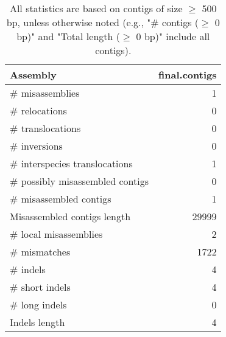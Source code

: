 \documentclass[12pt,a4paper]{article}
\begin{document}
\begin{table}[ht]
\begin{center}
\caption{All statistics are based on contigs of size $\geq$ 500 bp, unless otherwise noted (e.g., "\# contigs ($\geq$ 0 bp)" and "Total length ($\geq$ 0 bp)" include all contigs).}
\begin{tabular}{|l*{1}{|r}|}
\hline
Assembly & final.contigs \\ \hline
\# misassemblies & 1 \\ \hline
\hspace{5mm}\# relocations & 0 \\ \hline
\hspace{5mm}\# translocations & 0 \\ \hline
\hspace{5mm}\# inversions & 0 \\ \hline
\hspace{5mm}\# interspecies translocations & 1 \\ \hline
\# possibly misassembled contigs & 0 \\ \hline
\# misassembled contigs & 1 \\ \hline
Misassembled contigs length & 29999 \\ \hline
\# local misassemblies & 2 \\ \hline
\# mismatches & 1722 \\ \hline
\# indels & 4 \\ \hline
\hspace{5mm}\# short indels & 4 \\ \hline
\hspace{5mm}\# long indels & 0 \\ \hline
Indels length & 4 \\ \hline
\end{tabular}
\end{center}
\end{table}
\end{document}
